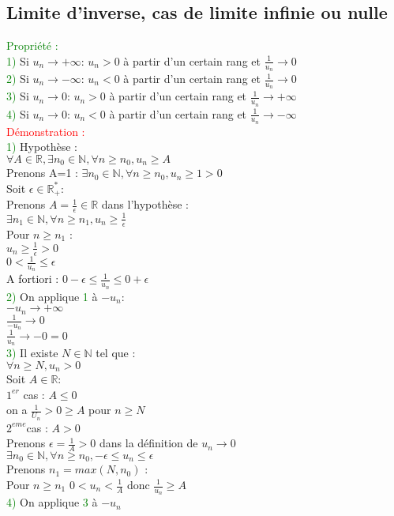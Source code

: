 \documentclass{article}
\begin{document}
\subsection{Limite d'inverse, cas de limite infinie ou nulle }
\textcolor{green}{Propriété :} \\ 
\textcolor{green}{1)} Si $u_n \rightarrow + \infty$: $u_n >0$ à partir d'un certain rang et $\frac{1}{u_n} \rightarrow 0$ \\ 
\textcolor{green}{2)} Si $u_n \rightarrow - \infty$: $u_n <0$ à partir d'un certain rang et $\frac{1}{u_n} \rightarrow 0$ \\
\textcolor{green}{3)} Si $u_n \rightarrow 0$: $u_n >0$ à partir d'un certain rang et $\frac{1}{u_n} \rightarrow + \infty$ \\
\textcolor{green}{4)} Si $u_n \rightarrow 0$: $u_n <0$ à partir d'un certain rang et $\frac{1}{u_n} \rightarrow - \infty$ \\
\textcolor{red}{Démonstration :} \\ 
\textcolor{green}{1)} Hypothèse : \\ 
$\forall A \in \mathbb{R}, \exists n_0 \in \mathbb{N}, \forall n \geq n_0, u_n \geq A$ \\ 
Prenons A=1 :
$\exists n_0 \in \mathbb{N}, \forall n \geq n_0, u_n \geq 1 >0$ \\ 
Soit $ \epsilon \in \mathbb{R}^*_+$: \\ 
Prenons $A=\frac{1}{\epsilon} \in \mathbb{R}$ dans l'hypothèse : \\
$\exists n_1 \in \mathbb{N}, \forall n \geq n_1, u_n \geq \frac{1}{\epsilon}$ \\ 
Pour $n \geq n_1$ : \\ 
$u_n\geq \frac{1}{\epsilon}>0$ \\ 
$0<\frac{1}{u_n}\leq \epsilon$ \\ 
A fortiori : $0- \epsilon \leq \frac{1}{u_n} \leq 0+\epsilon $ \\ 
\textcolor{green}{2)} On applique \textcolor{green}{1} à $-u_n$: \\ 
$- u_n \rightarrow + \infty$ \\
$\frac{1}{- u_n} \rightarrow 0$ \\
$\frac{1}{ u_n} \rightarrow -0=0$ \\ 
\textcolor{green}{3)} Il existe $N \in \mathbb{N}$ tel que : \\ 
$\forall n \geq N, u_n >0$ \\
Soit $A \in \mathbb{R}$: \\ 
$1^{er}$ cas : $A \leq 0$ \\ 
on a $ \frac{1}{U_n}>0\geq A$ pour $n \geq N$ \\ 
$2^{eme}$cas : $A>0$ \\ 
Prenons $ \epsilon= \frac{1}{A}>0$ dans la définition de $u_n \rightarrow 0$ \\ 
$\exists n_0 \in \mathbb{N}, \forall n \geq n_0, - \epsilon \leq u_n \leq \epsilon$ \\ 
Prenons $n_1=max(N,n_0)$ : \\
Pour $n \geq n_1$ $0<u_n<\frac{1}{A}$ donc $\frac{1}{u_n} \geq A$ \\
\textcolor{green}{4)} On applique \textcolor{green}{3} à $-u_n$
\end{document}
